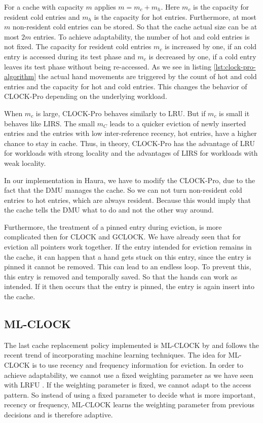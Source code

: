 \documentclass[
	12pt,
	a4paper,
	abstract,
	bibliography=totoc,
	chapterprefix,
	headings=openright,
	numbers=endperiod,
	parskip=half,
	twoside,
]{scrreprt}
\begin{document}
For a cache with capacity $m$ applies $m = m_c + m_h$.
Here $m_c$ is the capacity for resident cold entries and $m_h$ is the capacity for hot entries.
Furthermore, at most $m$ non-resident cold entries can be stored.
So that the cache actual size can be at most $2m$ entries.
To achieve adaptability, the number of hot and cold entries is not fixed.
The capacity for resident cold entries $m_c$ is increased by one, if an cold entry is accessed during its test phase 
and $m_c$ is decreased by one, if a cold entry leaves its test phase without being re-accessed.
As we see in listing \ref{lst:clock-pro-algorithm} the actual hand movements are triggered by the count of hot and cold entries and the 
capacity for hot and cold entries.
This changes the behavior of CLOCK-Pro depending on the underlying workload.

When $m_c$ is large, CLOCK-Pro behaves similarly to LRU. But if $m_c$ is small it behaves like LIRS.
The small $m_C$ leads to a quicker eviction of newly inserted entries and the entries with low inter-reference recency, hot entries, have a higher 
chance to stay in cache. Thus, in theory, CLOCK-Pro has the advantage of LRU for workloads with strong locality and 
the advantages of LIRS for workloads with weak locality.

In our implementation in Haura, we have to modify the CLOCK-Pro, due to the fact that the DMU manages the cache.
So we can not turn non-resident cold entries to hot entries, which are always resident.
Because this would imply that the cache tells the DMU what to do and not the other way around.

Furthermore, the treatment of a pinned entry during eviction, is more complicated then for CLOCK and GCLOCK.
We have already seen that for eviction all pointers work together. If the entry intended for eviction remains in the cache, it can happen that a 
hand gets stuck on this entry, since the entry is pinned it cannot be removed. This can lead to an endless loop. To prevent this, this entry is 
removed and temporally saved. So that the hands can work as intended.
If it then occurs that the entry is pinned, the entry is again insert into the cache.

\subsection{ML-CLOCK}
\label{sub:ml-clock}

The last cache replacement policy implemented is ML-CLOCK by \cite{cho2021ml} and 
follows the recent trend of incorporating machine learning techniques.
The idea for ML-CLOCK is to use recency and frequency information for eviction.
In order to achieve adaptability, we cannot use a fixed weighting parameter as we have seen with LRFU \cite{lee2001lrfu}. 
If the weighting parameter is fixed, we cannot adapt to the access pattern.
So instead of using a fixed parameter to decide what is more important, recency 
or frequency,
ML-CLOCK learns the weighting parameter from previous decisions and is therefore adaptive.
\end{document}
